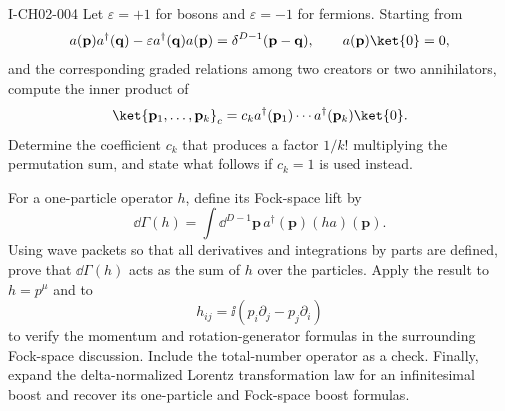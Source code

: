\begin{exercise}{I-CH02-004}
Let $\varepsilon=+1$ for bosons and $\varepsilon=-1$ for fermions. Starting
from
\[
  a(\mathbf p)a^\dagger(\mathbf q)
  -\varepsilon a^\dagger(\mathbf q)a(\mathbf p)
  =\delta^{D-1}(\mathbf p-\mathbf q),
  \qquad a(\mathbf p)\ket{0}=0,
\]
and the corresponding graded relations among two creators or two annihilators,
compute the inner product of
\[
  \ket{\mathbf p_1,\ldots,\mathbf p_k}_{c}
  =c_k a^\dagger(\mathbf p_1)\cdots a^\dagger(\mathbf p_k)\ket{0}.
\]
Determine the coefficient $c_k$ that produces a factor $1/k!$ multiplying the
permutation sum, and state what follows if $c_k=1$ is used instead.

For a one-particle operator $h$, define its Fock-space lift by
\[
  \dd\Gamma(h)=\int\dd^{D-1}\mathbf p\,a^\dagger(\mathbf p)(h a)(\mathbf p).
\]
Using wave packets so that all derivatives and integrations by parts are
defined, prove that $\dd\Gamma(h)$ acts as the sum of $h$ over the particles.
Apply the result to $h=p^\mu$ and to
\[
  h_{ij}=\ii(p_i\partial_j-p_j\partial_i)
\]
to verify the momentum and rotation-generator formulas in the surrounding
Fock-space discussion. Include the total-number operator as a check. Finally,
expand the delta-normalized Lorentz transformation law for an infinitesimal
boost and recover its one-particle and Fock-space boost formulas.
\end{exercise}
